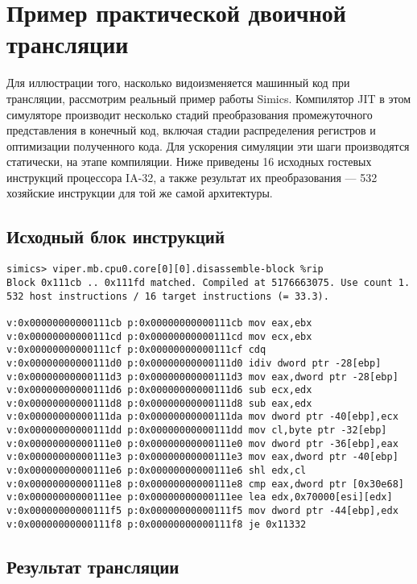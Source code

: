 \section[Пример практической двоичной трансляции]{Пример практической двоичной трансляции}

Для иллюстрации того, насколько видоизменяется машинный код при трансляции, рассмотрим реальный пример работы Simics. Компилятор JIT в этом симуляторе производит несколько стадий преобразования промежуточного представления в конечный код, включая стадии распределения регистров и оптимизации полученного кода. Для ускорения симуляции эти шаги производятся статически, на этапе компиляции. Ниже приведены 16 исходных гостевых инструкций процессора IA-32, а также результат их преобразования --- 532 хозяйские инструкции для той же самой архитектуры.

\subsection{Исходный блок инструкций}

\begin{lstlisting}
simics> viper.mb.cpu0.core[0][0].disassemble-block %rip
Block 0x111cb .. 0x111fd matched. Compiled at 5176663075. Use count 1.
532 host instructions / 16 target instructions (= 33.3).

v:0x00000000000111cb p:0x00000000000111cb mov eax,ebx
v:0x00000000000111cd p:0x00000000000111cd mov ecx,ebx
v:0x00000000000111cf p:0x00000000000111cf cdq
v:0x00000000000111d0 p:0x00000000000111d0 idiv dword ptr -28[ebp]
v:0x00000000000111d3 p:0x00000000000111d3 mov eax,dword ptr -28[ebp]
v:0x00000000000111d6 p:0x00000000000111d6 sub ecx,edx
v:0x00000000000111d8 p:0x00000000000111d8 sub eax,edx
v:0x00000000000111da p:0x00000000000111da mov dword ptr -40[ebp],ecx
v:0x00000000000111dd p:0x00000000000111dd mov cl,byte ptr -32[ebp]
v:0x00000000000111e0 p:0x00000000000111e0 mov dword ptr -36[ebp],eax
v:0x00000000000111e3 p:0x00000000000111e3 mov eax,dword ptr -40[ebp]
v:0x00000000000111e6 p:0x00000000000111e6 shl edx,cl
v:0x00000000000111e8 p:0x00000000000111e8 cmp eax,dword ptr [0x30e68]
v:0x00000000000111ee p:0x00000000000111ee lea edx,0x70000[esi][edx]
v:0x00000000000111f5 p:0x00000000000111f5 mov dword ptr -44[ebp],edx
v:0x00000000000111f8 p:0x00000000000111f8 je 0x11332
\end{lstlisting}

\subsection{Результат трансляции}

